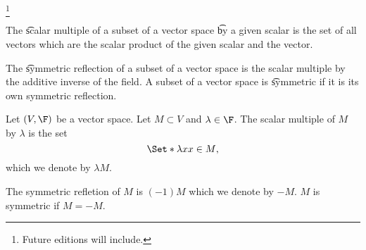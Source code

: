
\footnote{Future editions will include.}


The \t{scalar multiple} of a subset of a vector space \t{by} a given scalar is the set of all vectors which are the scalar product of the given scalar and the vector.

The \t{symmetric reflection} of a subset of a vector space is the scalar multiple by the additive inverse of the field.
A subset of a vector space is \t{symmetric} if it is its own symmetric reflection.


Let $(V, \F)$ be a vector space.
Let $M \subset V$ and $\lambda \in \F$.
The scalar multiple of $M$ by $\lambda$ is the set
\[
  \Set*{\lambda x}{x \in M},
\]
which we denote by $\lambda M$.

The symmetric refletion of $M$ is  $(-1)M$ which we denote by $-M$.
$M$ is symmetric if $M = -M$.

\blankpage

